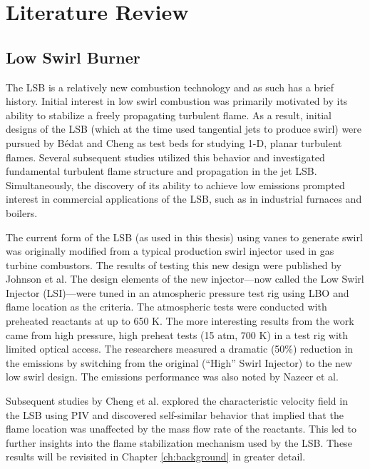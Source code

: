 \section{Literature Review}

\subsection{Low Swirl Burner}
\label{subsec:literature-review-lsb}

The LSB is a relatively new combustion technology and as such has a brief history.
Initial interest in low swirl combustion was primarily motivated by its ability to stabilize a freely propagating turbulent flame.\cite{1992-chan}
As a result, initial designs of the LSB (which at the time used tangential jets to produce swirl) were pursued by B{\'edat} and Cheng\cite{1995-bedat,1995-cheng} as test beds for studying 1-D, planar turbulent flames.
Several subsequent studies\cite{2000-plessing,2001-shepherd,2002-cheng,2002-shepherd,2004-kortschik,2005-degoey,2007-bell} utilized this behavior and investigated fundamental turbulent flame structure and propagation in the jet LSB.
Simultaneously, the discovery of its ability to achieve low  emissions prompted interest in commercial applications of the LSB, such as in industrial furnaces and boilers.\cite{1998-yegian,2000-cheng,2002-littlejohn}

The current form of the LSB (as used in this thesis) using vanes to generate swirl was originally modified from a typical production swirl injector used in gas turbine combustors.
The results of testing this new design were published by Johnson et al.\cite{2005-johnson}
The design elements of the new injector---now called the Low Swirl Injector (LSI)---were tuned in an atmospheric pressure test rig using LBO and flame location as the criteria.
The atmospheric tests were conducted with preheated reactants at up to 650 K.
The more interesting results from the work came from high pressure, high preheat tests (15 atm, 700 K) in a test rig with limited optical access.
The researchers measured a dramatic (50\%) reduction in the  emissions by switching from the original (``High'' Swirl Injector) to the new low swirl design.
The emissions performance was also noted by Nazeer et al.\cite{2006-nazeer}

Subsequent studies by Cheng et al.\cite{2006-cheng,2008-cheng-a} explored the characteristic velocity field in the LSB using PIV and discovered self-similar behavior that implied that the flame location was unaffected by the mass flow rate of the reactants.
This led to further insights into the flame stabilization mechanism used by the LSB.
These results will be revisited in Chapter \ref{ch:background} in greater detail.

